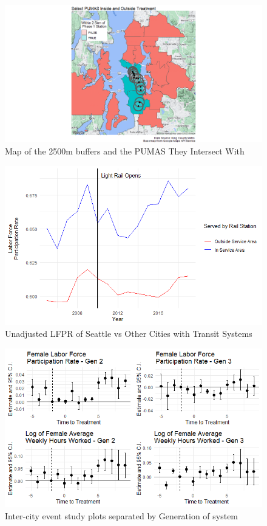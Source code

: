 \documentclass{article}
\begin{document}
\begin{appendices}
\begin{figure}[h]
\caption{Map of the 2500m buffers and the PUMAS They Intersect With}
\label{maps:buffer}
\centering
\includegraphics[width=1.0\textwidth]{Maps/PUMA_treatment_areas.png}
\end{figure}

\begin{figure}[h]
\caption{Unadjusted LFPR of Seattle vs Other Cities with Transit Systems}
\label{maps:intra}
\centering
\includegraphics[width=1.0\textwidth]{Graphs/intra_graph.png}
\end{figure}

\begin{figure}[h]
\caption{Inter-city event study plots separated by Generation of system}
\label{fig:gen_sep}
\centering
\includegraphics[width=1.0\textwidth]{Graphs/emp_outcome_gensep.png}
\end{figure}


\end{appendices}
\end{document}
